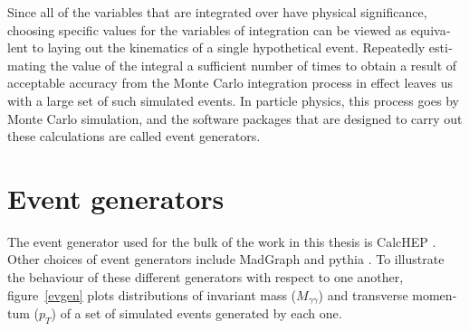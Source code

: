 \begin{english}
Since all of the variables that are integrated over have physical significance, choosing specific values for the variables of integration can be viewed as equivalent to laying out the kinematics of a single hypothetical event. Repeatedly estimating the value of the integral a sufficient number of times to obtain a result of acceptable accuracy from the Monte Carlo integration process in effect leaves us with a large set of such simulated events. In particle physics, this process goes by Monte Carlo simulation, and the software packages that are designed to carry out these calculations are called event generators.

\section{Event generators}

The event generator used for the bulk of the work in this thesis is CalcHEP \cite{calchep}. Other choices of event generators include MadGraph \cite{madgraph5} and pythia \cite{pythia}. To illustrate the behaviour of these different generators with respect to one another, figure~\ref{evgen} plots distributions of invariant mass ($M_{\gamma\gamma}$) and transverse momentum ($p_T$) of a set of simulated events generated by each one.

\begin{figure}[hbtp]
\begin{minipage}[b]{.69\textwidth}
\begin{infilsf} \tiny
\hspace{-1ex}\makebox[0pt][l]{}
\end{infilsf}
\end{minipage}
\begin{minipage}[b]{.3\textwidth}

\phantom{p}
\end{minipage}
\begin{minipage}[b]{.69\textwidth}
\begin{infilsf} \tiny
\hspace{-1ex}\makebox[0pt][l]{}
\end{infilsf}
\end{minipage}
\begin{minipage}[b]{.3\textwidth}


\end{minipage}
\end{figure}
\end{english}

